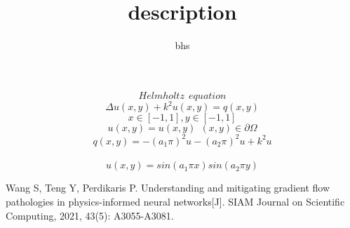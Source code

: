 \documentclass[12pt]{amsart}
\title{description}
\author{bhs}
\begin{document}
\maketitle

$$Helmholtz \ \ equation$$
$$\Delta u(x,y)+k^{2}u(x,y)=q(x,y)$$
$$x\in [-1,1] ,y \in [-1,1]$$
$$u(x,y) = u(x,y)\ \ (x,y) \in \partial \Omega$$
$$q(x,y)=-(a_{1}\pi)^{2}u-(a_{2}\pi)^{2}u+k^{2}u$$\\
$$u(x,y) = sin(a_{1}\pi x)sin(a_{2}\pi y)$$


\begin{thebibliography}{10}
Wang S, Teng Y, Perdikaris P. Understanding and mitigating gradient flow pathologies in physics-informed neural networks[J]. SIAM Journal on Scientific Computing, 2021, 43(5): A3055-A3081.
\end{thebibliography}
\end{document}
